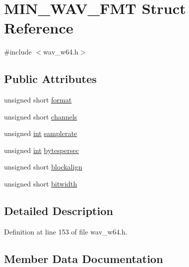 \hypertarget{struct_m_i_n___w_a_v___f_m_t}{}\section{M\+I\+N\+\_\+\+W\+A\+V\+\_\+\+F\+MT Struct Reference}
\label{struct_m_i_n___w_a_v___f_m_t}


{\ttfamily \#include $<$wav\+\_\+w64.\+h$>$}

\subsection*{Public Attributes}
\begin{DoxyCompactItemize}
\item 
unsigned short \hyperlink{struct_m_i_n___w_a_v___f_m_t_a4eb0c609627d059cca3519df39250acd}{format}
\item 
unsigned short \hyperlink{struct_m_i_n___w_a_v___f_m_t_a272fcd8ef29fdafd7811523cddb92ad0}{channels}
\item 
unsigned \hyperlink{xmltok_8h_a5a0d4a5641ce434f1d23533f2b2e6653}{int} \hyperlink{struct_m_i_n___w_a_v___f_m_t_aa2f057b10fa3d61f779e582a300ea795}{samplerate}
\item 
unsigned \hyperlink{xmltok_8h_a5a0d4a5641ce434f1d23533f2b2e6653}{int} \hyperlink{struct_m_i_n___w_a_v___f_m_t_afc868f9c7893d4ab71b1a4fdce483dd1}{bytespersec}
\item 
unsigned short \hyperlink{struct_m_i_n___w_a_v___f_m_t_ac00f95eaa3e2e6476362a74c51655a00}{blockalign}
\item 
unsigned short \hyperlink{struct_m_i_n___w_a_v___f_m_t_a5672d93ddd4a0794696f136eab834594}{bitwidth}
\end{DoxyCompactItemize}


\subsection{Detailed Description}


Definition at line 153 of file wav\+\_\+w64.\+h.



\subsection{Member Data Documentation}
